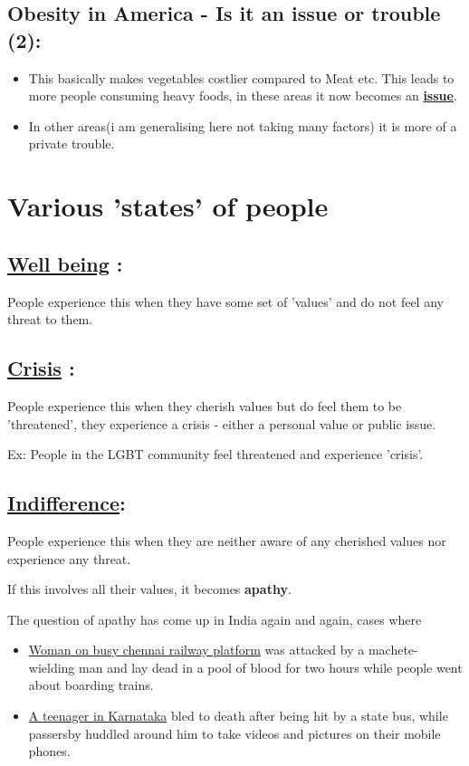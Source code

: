 \documentclass[11pt]{article}
\begin{document}
\subsection{Obesity in America - Is it an issue or trouble (2):}
\label{sec:orga4e1a94}

\begin{itemize}
\item This basically makes vegetables costlier compared to Meat etc. This leads
to more people consuming heavy foods, in these areas it now becomes
an \textbf{\uline{issue}}.

\item In other areas(i am generalising here not taking many factors) it is more
of a private trouble.
\end{itemize}

\section{Various 'states' of people}
\label{sec:org8725e54}
\subsection{\textbf{\underline{Well being}} :}
\label{sec:org0886c63}
People experience this when they have some set of 'values' and do not
feel any threat to them.
\subsection{\textbf{\underline{Crisis}} :}
\label{sec:orgd0efb1b}
People experience this when they cherish values but do feel them to be
'threatened', they experience a crisis - either a personal value or
public issue.

Ex: People in the LGBT community feel threatened and experience 'crisis'.
\subsection{\textbf{\underline{Indifference}}:}
\label{sec:orgbe39673}
People experience this when they are neither aware of any cherished values
nor experience any threat.

If this involves all their values, it becomes \textbf{apathy}.

The question of apathy has come up in India again and again, cases where

\begin{itemize}
\item \href{https://www.ndtv.com/chennai-news/after-techies-killing-chennai-grapples-with-questions-on-apathy-1424194}{Woman on busy chennai railway platform} was attacked by a machete-wielding
man and lay dead in a pool of blood for two hours while people went about
boarding trains.

\item \href{https://indianexpress.com/article/opinion/web-edits/boy-bleeds-to-death-in-karnataka-our-indifference-is-appalling-4504660/}{A teenager in Karnataka} bled to death after being hit by a state bus,
while passersby huddled around him to take videos and pictures on their
mobile phones.
\end{itemize}
\end{document}
